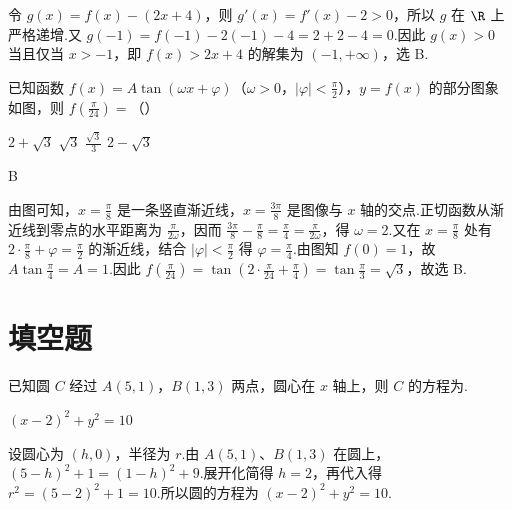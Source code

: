 \begin{solution}
令 \(g(x)=f(x)-(2x+4)\)，则 \(g'(x)=f'(x)-2>0\)，所以 \(g\) 在 \(\R\) 上严格递增.又
\(\displaystyle g(-1)=f(-1)-2(-1)-4=2+2-4=0\).因此 \(g(x)>0\) 当且仅当 \(x>-1\)，即 \(f(x)>2x+4\) 的解集为 \((-1,+\infty)\)，选 B.
\end{solution}

\begin{problem}
已知函数 \(f(x) = A \tan(\omega x + \varphi)\)（\(\omega > 0\)，\(|\varphi| < \frac{\pi}{2}\)），\(y = f(x)\) 的部分图象如图，则 \(f\left(\frac{\pi}{24}\right) =\)（\quad）


\choices
    {\(2 + \sqrt{3}\)}
    {\(\sqrt{3}\)}
    {\(\frac{\sqrt{3}}{3}\)}
    {\(2 - \sqrt{3}\)}
\end{problem}

\begin{answer}
B
\end{answer}

\begin{solution}
由图可知，\(x=\frac{\pi}{8}\) 是一条竖直渐近线，\(x=\frac{3\pi}{8}\) 是图像与 \(x\) 轴的交点.正切函数从渐近线到零点的水平距离为 \(\tfrac{\pi}{2\omega}\)，因而
\(\displaystyle \frac{3\pi}{8}-\frac{\pi}{8}=\frac{\pi}{4}=\frac{\pi}{2\omega}\)，得 \(\omega=2\).又在 \(x=\frac{\pi}{8}\) 处有 \(2\cdot\frac{\pi}{8}+\varphi=\frac{\pi}{2}\) 的渐近线，结合 \(|\varphi|<\frac{\pi}{2}\) 得 \(\varphi=\frac{\pi}{4}\).由图知 \(f(0)=1\)，故 \(A\tan\frac{\pi}{4}=A=1\).因此
\(\displaystyle f\left(\frac{\pi}{24}\right)=\tan\left(2\cdot\frac{\pi}{24}+\frac{\pi}{4}\right)
=\tan\frac{\pi}{3}=\sqrt3\)，故选 B.
\end{solution}

\section{填空题}

\begin{problem}
已知圆 \(C\) 经过 \(A(5,1)\)，\(B(1,3)\) 两点，圆心在 \(x\) 轴上，则 \(C\) 的方程为\fillinblank{}.
\end{problem}

\begin{answer}
\((x-2)^2+y^2=10\)
\end{answer}

\begin{solution}
设圆心为 \((h,0)\)，半径为 \(r\).由 \(A(5,1)\)、\(B(1,3)\) 在圆上，
\(\displaystyle (5-h)^2+1=(1-h)^2+9\).展开化简得 \(h=2\)，再代入得
\(\displaystyle r^2=(5-2)^2+1=10\).所以圆的方程为 \((x-2)^2+y^2=10\).
\end{solution}

